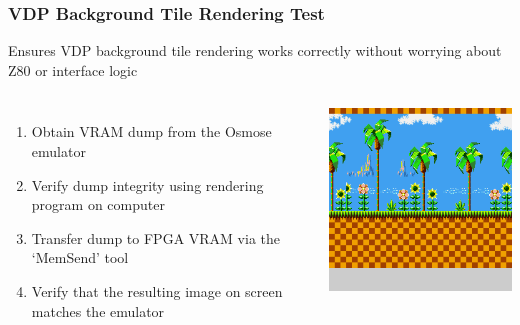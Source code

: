 \documentclass[xcolor=table]{beamer}
\newlength{\wideitemsep}
\let\olditem\item
\renewcommand{\item}{\setlength{\itemsep}{\wideitemsep}\olditem}
\begin{document}
\begin{frame}
    \frametitle{VDP Background Tile Rendering Test}
    Ensures VDP background tile rendering works correctly without worrying about Z80 or interface logic
    \vspace{\baselineskip}
    \begin{columns}[c]
        \begin{enumerate}
            \item Obtain VRAM dump from the Osmose emulator
            \item Verify dump integrity using rendering program on computer
            \item Transfer dump to FPGA VRAM via the `MemSend' tool
            \item Verify that the resulting image on screen matches the emulator
        \end{enumerate}
        \includegraphics[width=\textwidth]{../images/screen.png}
    \end{columns}
\end{frame}
\end{document}
